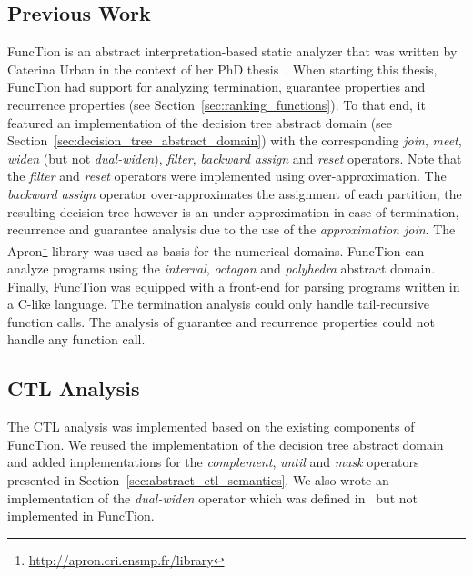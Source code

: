 \documentclass[11pt,a4paper,titlepage]{article}
\theoremstyle{definition}
\begin{document}
\subsection{Previous Work}
FuncTion is an abstract interpretation-based static analyzer that was written by Caterina Urban 
in the context of her PhD thesis~\cite{UrbanPhd}. 
When starting this thesis, FuncTion had support  for analyzing termination, guarantee properties and
recurrence properties (see Section~\ref{sec:ranking_functions}). To that end, it featured an implementation of 
the decision tree abstract domain (see Section~\ref{sec:decision_tree_abstract_domain}) with the corresponding \textit{join}, \textit{meet}, 
\textit{widen} (but not \textit{dual-widen}), \textit{filter}, \textit{backward assign} and \textit{reset} operators.
Note that the \textit{filter} and \textit{reset} operators were implemented using over-approximation. The \textit{backward assign}
operator over-approximates the assignment of each partition, the resulting decision tree however is an under-approximation 
in case of termination, recurrence and guarantee analysis due to the use of the \textit{approximation join}.   
The Apron\footnote{\url{http://apron.cri.ensmp.fr/library}} library was used as basis for the numerical domains. 
FuncTion can analyze programs using the \textit{interval}, \textit{octagon} and \textit{polyhedra} abstract domain.
Finally, FuncTion was equipped with a front-end for parsing programs written in a C-like language. 
The termination analysis could only handle tail-recursive function calls. 
The analysis of guarantee and recurrence properties could not handle any function call.

\subsection{CTL Analysis}

The CTL analysis was implemented based on the existing components of FuncTion. We reused the implementation of the decision tree abstract domain
and added implementations for the \textit{complement}, \textit{until} and \textit{mask} operators presented in Section~\ref{sec:abstract_ctl_semantics}.
We also wrote an implementation of the \textit{dual-widen} operator which was defined in~\cite{UrbanPhd} but not implemented in FuncTion.\\
\end{document}
